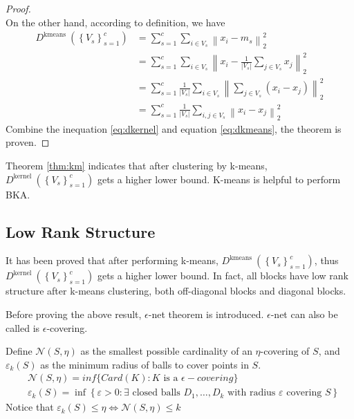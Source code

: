 \documentclass[12pt, a4paper, oneside]{article}
\begin{document}
\begin{proof}
\begin{equation}
\end{equation}
On the other hand, according to definition, we have
\begin{equation}
	\label{eq:dkmeans}
\begin{aligned}
	D^{\text {kmeans }}\left(\left\{V_{s}\right\}_{s=1}^{c}\right) &= \sum_{s=1}^{c} \sum_{i \in V_{s}}\left\|x_{i}-m_{s}\right\|_{2}^{2} \\
	&=\sum_{s=1}^{c} \sum_{i \in V_{s}}\left\|x_{i}-\frac{1}{\left|V_{s}\right|} \sum_{j \in V_{s}} x_{j}\right\|_{2}^{2} \\
	&=\sum_{s=1}^{c} \frac{1}{\left|V_{s}\right|} \sum_{i \in V_{s}}\left\|\sum_{j \in V_{s}}\left(x_{i}-x_{j}\right)\right\|_{2}^{2} \\
	&=\sum_{s=1}^{c} \frac{1}{\left|V_{s}\right|} \sum_{i, j \in V_{s}}\left\|x_{i}-x_{j}\right\|_{2}^{2}
\end{aligned}
\end{equation}
Combine the inequation \ref{eq:dkernel} and equation \ref{eq:dkmeans}, the theorem is proven.
\end{proof}

Theorem \ref{thm:km} indicates that after clustering by k-means, $D^{\text {kernel }}\left(\left\{V_{s}\right\}_{s=1}^{c}\right)$ gets a higher lower bound. K-means is helpful to perform BKA.

\subsection{Low Rank Structure}
\label{subsec:lrs}

It has been proved that after performing k-means, $D^{\text {kmeans }}\left(\left\{V_{s}\right\}_{s=1}^{c}\right)$, thus $D^{\text {kernel }}\left(\left\{V_{s}\right\}_{s=1}^{c}\right)$ gets a higher lower bound. In fact, all blocks have low rank structure after k-means clustering, both off-diagonal blocks and diagonal blocks.

Before proving the above result, $\epsilon$-net theorem is introduced. $\epsilon$-net can also be called is $\epsilon$-covering.

Define $\mathcal{N}(S, \eta)$ as the smallest possible cardinality of an $\eta$-covering of $S$, and $\varepsilon_{k}(S)$ as the minimum radius of balls to cover points in $S$.
\begin{equation}
	\begin{aligned}
		&\mathcal{N}(S, \eta) = inf\{Card(K): K\text{ is a } \epsilon-covering\} \\
		&\varepsilon_{k}(S)=\inf \left\{\varepsilon>0: \exists \text { closed balls } D_{1}, \ldots, D_{k} \text { with radius } \varepsilon \text { covering } S\right\}
	\end{aligned}
\end{equation}
Notice that $\varepsilon_{k}(S) \leq \eta \Longleftrightarrow \mathcal{N}(S, \eta) \leq k$
\end{document}
